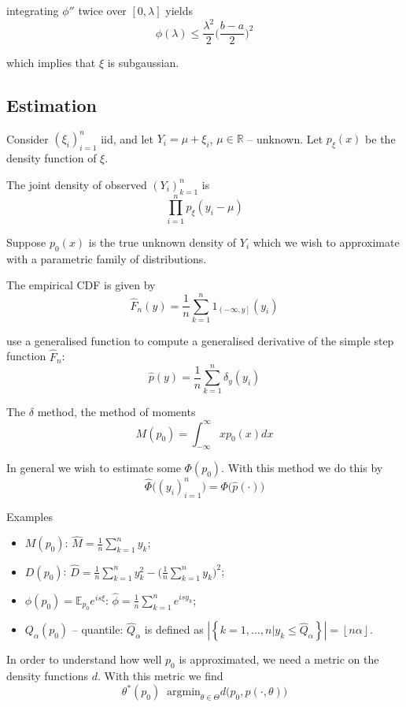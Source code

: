 \documentclass[a4paper]{article}
\newcommand{\obj}[1]{{\left\{ #1 \right \}}}
\newcommand{\clo}[1]{{\left [ #1 \right ]}}
\newcommand{\ploc}[1]{{\left ( #1 \right ]}}
\newcommand{\brac}[1]{{\left ( #1 \right )}}
\newcommand{\induc}[1]{{\left . #1 \right \vert}}
\newcommand{\abs}[1]{{\left | #1 \right |}}
\newcommand{\floor}[1]{{\left\lfloor #1 \right\rfloor}}
\newcommand{\Real}{\mathbb{R}}
\newcommand{\Ex}{\mathbb{E}}
\newcommand{\defn}{\mathop{\overset{\Delta}{=}}\nolimits}
\begin{document}
integrating $\phi''$ twice over $\clo{0,\lambda}$ yields
\[\phi(\lambda) \leq \frac{\lambda^2}{2}\bigg(\frac{b-a}{2}\bigg)^2\]

which implies that $\xi$ is subgaussian.


\subsection{Estimation} %
\label{sub:estimation}

Consider $\brac{\xi_i}_{i=1}^n$ iid, and let $Y_i = \mu + \xi_i$, $\mu\in \Real$ -- unknown. Let $p_\xi(x)$ be the density function of $\xi$.

The joint density of observed $\brac{Y_i}_{k=1}^n$ is 
\[\prod_{i=1}^n p_\xi(y_i - \mu)\]

Suppose $p_0(x)$ is the true unknown density of $Y_i$ which we wish to approximate with a parametric family of distributions.

The empirical CDF is given by
\[\hat{F}_n(y) = \frac{1}{n}\sum_{k=1}^n 1_{\ploc{-\infty, y}}(y_i)\]

use a generalised function to compute a generalised derivative of the simple step function $\hat{F}_n$:
\[ \hat{p}(y) = \frac{1}{n} \sum_{k=1}^n \delta_y(y_i) \]


The $\delta$ method, the method of moments
\[M(p_0) = \int_{-\infty}^\infty x p_0(x) dx\]

In general we wish to estimate some $\Phi(p_0)$. With this method we do this by
\[\hat{\Phi}\big((y_i)_{i=1}^n\big) = \Phi\big(\hat{p}(\cdot)\big)\]

Examples
\begin{itemize}
	\item $M(p_0)$: $\hat{M} = \frac{1}{n}\sum_{k=1}^n y_k$;
	\item $D(p_0)$: $\hat{D} = \frac{1}{n}\sum_{k=1}^n y_k^2 - \big(\frac{1}{n}\sum_{k=1}^n y_k\big)^2$;
	\item $\phi(p_0) = \Ex_{p_0} e^{is\xi}$: $\hat{\phi} = \frac{1}{n}\sum_{k=1}^n e^{isy_k}$;
	\item $Q_\alpha(p_0)$ -- quantile: $\hat{Q}_\alpha$ is defined as $\abs{\obj{\induc{k=1,\ldots,n} y_k \leq \hat{Q}_\alpha}} = \floor{n\alpha}$.
\end{itemize}

In order to understand how well $p_0$ is approximated, we need a metric on the density functions $d$. With this metric we find
\[\theta^*(p_0) \defn \text{argmin}_{\theta \in\Theta} d\Big(p_0, p(\cdot,\theta)\Big) \]
\end{document}
